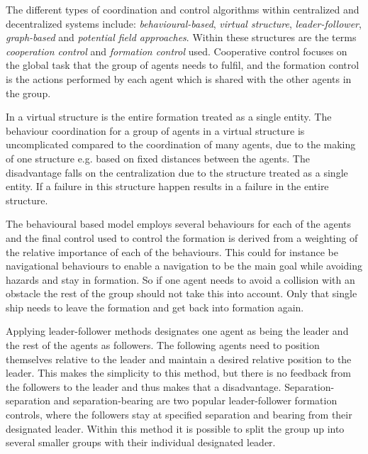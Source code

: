 The different types of coordination and control algorithms within centralized and decentralized systems include: \textit{behavioural-based}, \textit{virtual structure}, \textit{leader-follower}, \textit{graph-based} and \textit{potential field approaches}. Within these structures are the terms \textit{cooperation control} and \textit{formation control} used. Cooperative control focuses on the global task that the group of agents needs to fulfil, and the formation control is the actions performed by each agent which is shared with the other agents in the group. 
\begin{description}[style=nextline]
	\item [Virtual structure]
	In a virtual structure is the entire formation treated as a single entity. The behaviour coordination for a group of agents in a virtual structure is uncomplicated compared to the coordination of many agents, due to the making of one structure e.g. based on fixed distances between the agents. The disadvantage falls on the centralization due to the structure treated as a single entity. If a failure in this structure happen results in a failure in the entire structure.
	\item [Behaviour Based Methods]
	The behavioural based model employs several behaviours for each of the agents and the final control used to control the formation is derived from a weighting of the relative importance of each of the behaviours. This could for instance be navigational behaviours to enable a navigation to be the main goal while avoiding hazards and stay in formation. So if one agent needs to avoid a collision with an obstacle the rest of the group should not take this into account. Only that single ship needs to leave the formation and get back into formation again.
	\item [Leader-Follower Approaches]
	Applying leader-follower methods designates one agent as being the leader and the rest of the agents as followers. The following agents need to position themselves relative to the leader and maintain a desired relative position to the leader. This makes the simplicity to this method, but there is no feedback from the followers to the leader and thus makes that a disadvantage. Separation-separation and separation-bearing are two popular leader-follower formation controls, where the followers stay at specified separation and bearing from their designated leader. Within this method it is possible to split the group up into several smaller groups with their individual designated leader.
	\item [Potential Field Approach]

\end{description}
